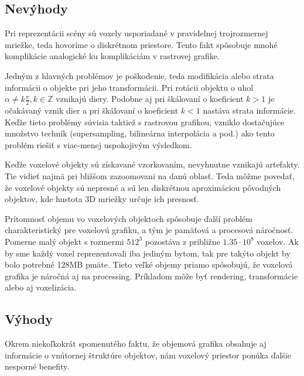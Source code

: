 \subsection{Nevýhody}
Pri reprezentácii scény sú voxely usporiadané v pravidelnej trojrozmernej mriežke, teda hovoríme o diskrétnom priestore. Tento fakt spôsobuje mnohé komplikácie analogické ku komplikáciám v rastrovej grafike.

Jedným z hlavných problémov je poškodenie, teda modifikácia alebo strata informácii o objekte pri jeho transformácii. Pri rotácii objektu o uhol \begin{math} \alpha \neq k\frac{\pi}{2}, k \in \mathbb{Z} \end{math}  vznikajú diery. Podobne aj pri škálovaní o koeficient \begin{math}k > 1\end{math} je očakávaný vznik dier a pri škálovaní o koeficient \begin{math}k < 1\end{math} nastáva strata informácie. Keďže tieto problémy súvisia taktiež s rastrovou grafikou, vzniklo dostačujúce množstvo techník (supersampling, bilineárna interpolácia a pod.) ako tento problém riešiť s viac-menej uspokojivým výsledkom.

Keďže voxelové objekty sú získavané vzorkovaním, nevyhnutne vznikajú artefakty. Tie vidieť najmä pri bližšom zazoomovani na danú oblasť. Teda môžme povedať, že voxelové objekty sú nepresné a sú len diskrétnou aproximáciou pôvodných objektov, kde hustota 3D mriežky určuje ich presnosť.

Prítomnosť objemu vo voxelových objektoch spôsobuje ďalší problém charakteristický pre voxelovú grafiku, a tým je pamäťová a procesová náročnosť. Pomerne malý objekt s rozmermi \begin{math}512^{3}\end{math} pozostáva z približne \begin{math}1.35\cdot 10^{8}\end{math} voxelov. Ak by sme každý voxel reprezentovali iba jediným bytom, tak pre takýto objekt by bolo potrebné 128MB pmäte. Tieto veľké objemy priamo spôsobujú, že voxelová grafika je náročná aj na processing. Príkladom môže byť rendering, transformácie alebo aj voxelizácia.

\subsection{Výhody}
Okrem niekoľkokrát spomenutého faktu, že objemová grafika obsahuje aj informácie o vnútornej štruktúre objektov, nám voxelový priestor ponúka ďalšie nesporné benefity.

